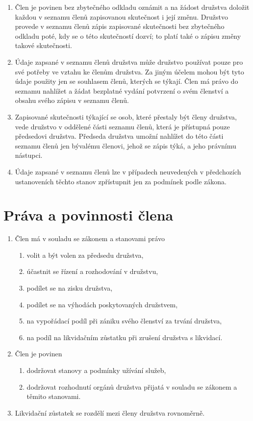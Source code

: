 \begin{enumerate}
\begin{enumerate}[label=\alph*.]
    \end{enumerate}
    \item Člen je povinen bez zbytečného odkladu oznámit a na žádost družstva doložit každou v seznamu členů zapisovanou skutečnost i její změnu. Družstvo provede v seznamu členů zápis zapisované skutečnosti bez zbytečného odkladu poté, kdy se o této skutečností dozví; to platí také o zápisu změny takové skutečnosti.
    \item Údaje zapsané v seznamu členů družstva může družstvo používat pouze pro své potřeby ve vztahu ke členům družstva. Za jiným účelem mohou být tyto údaje použity jen se souhlasem členů, kterých se týkají. Člen má právo do seznamu nahlížet a žádat bezplatné vydání potvrzení o svém členství a obsahu svého zápisu v seznamu členů.
    \item Zapisované skutečnosti týkající se osob, které přestaly být členy družstva, vede družstvo v oddělené části seznamu členů, která je přístupná pouze předsedovi družstva. Předseda družstva umožní nahlížet do této části seznamu členů jen bývalému členovi, jehož se zápis týká, a jeho právnímu nástupci.
    \item Údaje zapsané v seznamu členů lze v případech neuvedených v předchozích ustanoveních těchto stanov zpřístupnit jen za podmínek podle zákona.
\end{enumerate}

\section{Práva a povinnosti člena}
\begin{enumerate}
    \item Člen má v souladu se zákonem a stanovami právo
    \begin{enumerate}[label=\alph*.]
        \item volit a být volen za předsedu družstva,
        \item účastnit se řízení a rozhodování v družstvu,
        \item podílet se na zisku družstva,
        \item podílet se na výhodách poskytovaných družstvem,
        \item na vypořádací podíl při zániku svého členství za trvání družstva,
        \item na podíl na likvidačním zůstatku při zrušení družstva s likvidací.
    \end{enumerate}
    \item Člen je povinen
    \begin{enumerate}[label=\alph*.]
        \item dodržovat stanovy a podmínky užívání služeb,
        \item dodržovat rozhodnutí orgánů družstva přijatá v souladu se zákonem a těmito stanovami.
    \end{enumerate}
        \item Likvidační zůstatek se rozdělí mezi členy družstva rovnoměrně.
\end{enumerate}

